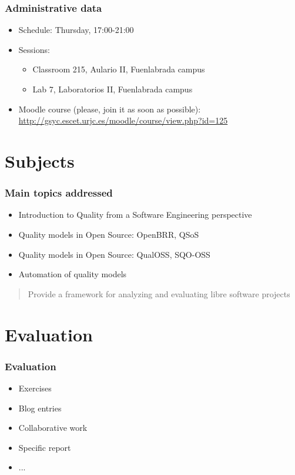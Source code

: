 \documentclass{beamer}
\begin{document}
\begin{frame}
\frametitle{Administrative data}

\begin{itemize}
\item Schedule: Thursday, 17:00-21:00
\item Sessions:
  \begin{itemize}
  \item Classroom 215, Aulario II, Fuenlabrada campus
  \item Lab 7, Laboratorios II, Fuenlabrada campus
  \end{itemize}
\item Moodle course (please, join it as soon as possible): \\
  \url{http://gsyc.escet.urjc.es/moodle/course/view.php?id=125}
\end{itemize}
\end{frame}

\section{Subjects}

\begin{frame}
\frametitle{Main topics addressed}

\begin{itemize}
\item Introduction to Quality from a Software Engineering perspective
\item Quality models in Open Source: OpenBRR, QSoS
\item Quality models in Open Source: QualOSS, SQO-OSS
\item Automation of quality models
\end{itemize}

\begin{quote}
\begin{center}
Provide a framework for analyzing and evaluating libre software projects
\end{center}
\end{quote}

\end{frame}

\section{Evaluation}


\begin{frame}
\frametitle{Evaluation}

\begin{itemize}
\item Exercises
\item Blog entries
\item Collaborative work
\item Specific report
\item ...
\end{itemize}

\end{frame}
\end{document}
